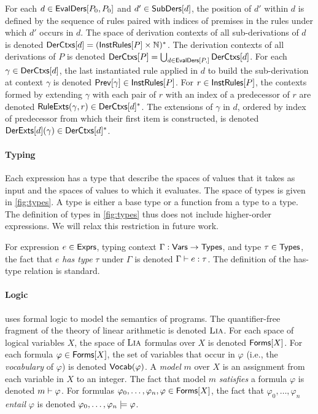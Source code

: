 For each $d \in \mathsf{EvalDers}[ P_0, P_0 ]$ and $d' \in \mathsf{SubDers}[ d ]$, the
position of $d'$ within $d$ is defined by the sequence of rules paired
with indices of premises in the rules under which $d'$ occurs in $d$.
%
The space of derivation contexts of all sub-derivations of $d$ is
denoted $\mathsf{DerCtxs}[ d ] = (\mathsf{InstRules}[ P ] \times \mathbb{N})^{*}$.
%
The derivation contexts of all derivations of $P$ is denoted
$\derctxs{P} = \bigunion_{ d \in \evalders{P} } \derctxs{ d }$.
%
For each $\gamma \in \mathsf{DerCtxs}[ d ]$, the last instantiated rule applied
in $d$ to build the sub-derivation at context $\gamma$ is denoted
$\mathsf{Prev}[  \gamma  ] \in \mathsf{InstRules}[ P ]$.
%
For $r \in \mathsf{InstRules}[  P  ]$, the contexts formed by extending $\gamma$
with each pair of $r$ with an index of a predecessor of $r$ are
denoted $\mathsf{RuleExts}(\gamma, r) \in \mathsf{DerCtxs}[ d ]^{*}$.
%
The extensions of $\gamma$ in $d$, ordered by index of predecessor
from which their first item is constructed, is denoted $\mathsf{DerExts}[  d
 ](\gamma) \in \mathsf{DerCtxs}[  d  ]^{*}$.

\paragraph{Typing}
%
Each expression has a type that describe the spaces of values that it
takes as input and the spaces of values to which it evaluates.
%
The space of types is given in \autoref{fig:types}.
%
A type is either a base type or a function from a type to a type.
%
The definition of types in \autoref{fig:types} thus does not include
higher-order expressions.
%
We will relax this restriction in future work.
%

For expression $e \in \mathsf{Exprs}$, typing context $\Gamma : \mathsf{Vars} \to
\mathsf{Types}$, and type $\tau \in \mathsf{Types}$, the fact that $e$ \emph{has type}
$\tau$ under $\Gamma$ is denoted $\Gamma \vdash e : \tau$.
%
The definition of the has-type relation is standard.

\paragraph{Logic}
%
\sys uses formal logic to model the semantics of programs.
%
The quantifier-free fragment of the theory of linear arithmetic is
denoted $\textsc{Lia}$.
%
For each space of logical variables $X$, the space of $\textsc{Lia}$ formulas
over $X$ is denoted $\mathsf{Forms}[ X ]$.
%
For each formula $\varphi \in \mathsf{Forms}[ X ]$, the set of variables that
occur in $\varphi$ (i.e., the \emph{vocabulary} of $\varphi$) is
denoted $\mathsf{Vocab}(\varphi)$.
A \lia \emph{model} $m$ over $X$ is an assignment from each variable
in $X$ to an integer.
%
The fact that model $m$ \emph{satisfies} a formula $\varphi$ is
denoted $m \vdash \varphi$.
%
For formulas $\varphi_0, \ldots, \varphi_n, \varphi \in \mathsf{Forms}[ X ]$,
the fact that $\varphi_0, \ldots, \varphi_n$ \emph{entail} $\varphi$
is denoted $\varphi_0, \ldots, \varphi_n \models \varphi$.

